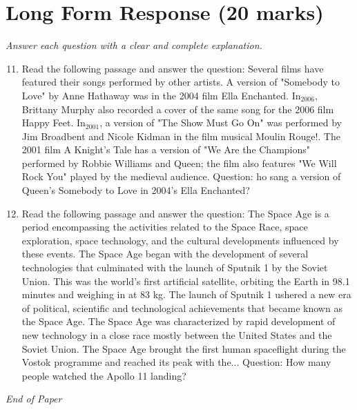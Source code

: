 \documentclass[12pt]{article}
\begin{document}
\section*{Long Form Response (20 marks)}
\textit{Answer each question with a clear and complete explanation.}
\begin{enumerate}[label=\arabic*.]
\setcounter{enumi}{10}
\item Read the following passage and answer the question: Several films have featured their songs performed by other artists. A version of "Somebody to Love" by Anne Hathaway was in the 2004 film Ella Enchanted. In$_{2006}$, Brittany Murphy also recorded a cover of the same song for the 2006 film Happy Feet. In$_{2001}$, a version of "The Show Must Go On" was performed by Jim Broadbent and Nicole Kidman in the film musical Moulin Rouge!. The 2001 film A Knight's Tale has a version of "We Are the Champions" performed by Robbie Williams and Queen; the film also features "We Will Rock You" played by the medieval audience. Question: ho sang a version of Queen's Somebody to Love in 2004's Ella Enchanted?
\item Read the following passage and answer the question: The Space Age is a period encompassing the activities related to the Space Race, space exploration, space technology, and the cultural developments influenced by these events. The Space Age began with the development of several technologies that culminated with the launch of Sputnik 1 by the Soviet Union. This was the world's first artificial satellite, orbiting the Earth in 98.1 minutes and weighing in at 83 kg. The launch of Sputnik 1 ushered a new era of political, scientific and technological achievements that became known as the Space Age. The Space Age was characterized by rapid development of new technology in a close race mostly between the United States and the Soviet Union. The Space Age brought the first human spaceflight during the Vostok programme and reached its peak with the... Question: How many people watched the Apollo 11 landing?
\end{enumerate}

\vfill
\noindent\textit{End of Paper}
\end{document}
